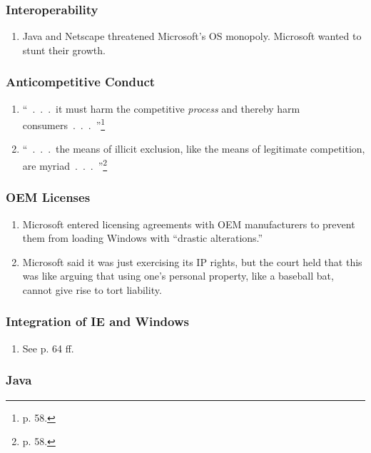 \subsubsection{Interoperability}

\begin{enumerate}
    \item Java and Netscape threatened Microsoft's OS monopoly. Microsoft 
    wanted to stunt their growth.
\end{enumerate}

\subsubsection{Anticompetitive Conduct}

\begin{enumerate}
    \item ``~.~.~.~it must harm the competitive \emph{process} and thereby 
    harm consumers~.~.~.~''\footnote{p. 58.}
    \item ``~.~.~.~the means of illicit exclusion, like the means of 
    legitimate competition, are myriad~.~.~.~''\footnote{p. 58.}
\end{enumerate}

\subsubsection{OEM Licenses}

\begin{enumerate}
    \item Microsoft entered licensing agreements with OEM manufacturers to 
    prevent them from loading Windows with ``drastic alterations.''
    \item Microsoft said it was just exercising its IP rights, but the court 
    held that this was like arguing that using one's personal property, like a 
    baseball bat, cannot give rise to tort liability.
\end{enumerate}

\subsubsection{Integration of IE and Windows}

\begin{enumerate}
    \item See p. 64 ff.
\end{enumerate}

\subsubsection{Java}


